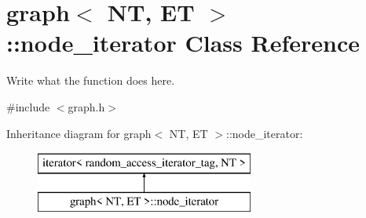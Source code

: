 \hypertarget{classgraph_1_1node__iterator}{\section{graph$<$ N\+T, E\+T $>$\+:\+:node\+\_\+iterator Class Reference}
\label{classgraph_1_1node__iterator}
}


Write what the function does here.  




{\ttfamily \#include $<$graph.\+h$>$}

Inheritance diagram for graph$<$ N\+T, E\+T $>$\+:\+:node\+\_\+iterator\+:\begin{figure}[H]
\begin{center}
\leavevmode
\includegraphics[height=2.000000cm]{classgraph_1_1node__iterator}
\end{center}
\end{figure}
